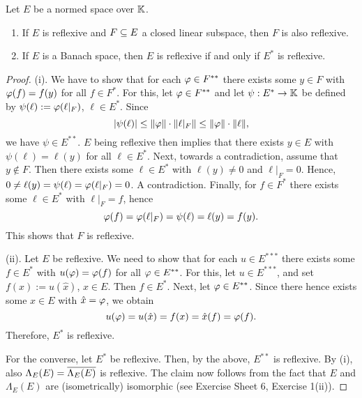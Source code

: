 \begin{theo}\label{4:t:refl_1}
Let $E$ be a normed space over $\mathbb{K}$.
\begin{enumerate}
\item[(i)] If $E$ is reflexive and $F\subseteq E$ a closed linear subspace, then $F$ is also reflexive.
\item[(ii)] If $E$ is a Banach space, then $E$ is reflexive if and only if $E^*$ is reflexive.
\end{enumerate}
\end{theo}
\begin{proof}
(i). We have to show that for each $\varphi\in F^{**}$ there exists some $y\in F$ with $\varphi(f) = f(y)$ for all $f\in F^*$. For this, let $\varphi\in F^{**}$ and let $\psi : E^*\to\mathbb{K}$ be defined by $\psi(\ell) := \varphi(\ell|_F)$, $\ell\in E^*$. Since
$$
|\psi(\ell)|\le\|\varphi\|\cdot\|\ell|_F\|\le\|\varphi\|\cdot\|\ell\|,
$$
we have $\psi\in E^{**}$. $E$ being reflexive then implies that there exists $y\in E$ with $\psi(\ell) = \ell(y)$ for all $\ell\in E^*$. Next, towards a contradiction, assume that $y\notin F$. Then there exists some $\ell\in E^*$ with $\ell(y)\neq 0$ and $\ell|_F = 0$. Hence, $0\neq\ell(y) = \psi(\ell) = \varphi(\ell|_F) = 0$. A contradiction. Finally, for $f\in F^*$ there exists some $\ell\in E^*$ with $\ell|_F = f$, hence
$$
\varphi(f) = \varphi(\ell|_F) = \psi(\ell) = \ell(y) = f(y).
$$
This shows that $F$ is reflexive.

(ii). Let $E$ be reflexive. We need to show that for each $u\in E^{***}$ there exists some $f\in E^*$ with $u(\varphi) = \varphi(f)$ for all $\varphi\in E^{**}$. For this, let $u\in E^{***}$, and set $f(x) := u(\hat x)$, $x\in E$. Then $f\in E^*$. Next, let $\varphi\in E^{**}$. Since there hence exists some $x\in E$ with $\hat x = \varphi$, we obtain
$$
u(\varphi) = u(\hat x) = f(x) = \hat x(f) = \varphi(f).
$$
Therefore, $E^*$ is reflexive.

For the converse, let $E^*$ be reflexive. Then, by the above, $E^{**}$ is reflexive. By (i), also $\Lambda_E(E) = \overline{\Lambda_E(E)}$ is reflexive. The claim now follows from the fact that $E$ and $\Lambda_E(E)$ are (isometrically) isomorphic (see Exercise Sheet 6, Exercise 1(ii)).
\end{proof}

